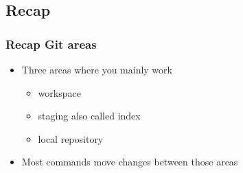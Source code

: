 \subsection{Recap}
\begin{frame}
    \frametitle{Recap Git areas}
    \begin{itemize}
        \item Three areas where you mainly work
            \begin{itemize}
                \item workspace
                \item staging also called index
                \item local repository
            \end{itemize}
        \item Most commands move changes between those areas
    \end{itemize}
\end{frame}


